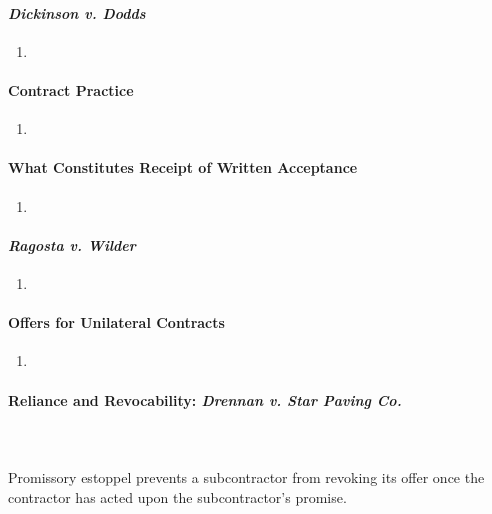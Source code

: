\paragraph{\emph{Dickinson v. Dodds}}

\begin{enumerate}
    \item %
\end{enumerate}

\paragraph{Contract Practice}

\begin{enumerate}
    \item %
\end{enumerate}

\paragraph{What Constitutes Receipt of Written Acceptance}

\begin{enumerate}
    \item %
\end{enumerate}

\paragraph{\emph{Ragosta v. Wilder}}

\begin{enumerate}
    \item %
\end{enumerate}

\paragraph{Offers for Unilateral Contracts}

\begin{enumerate}
    \item %
\end{enumerate}

\paragraph{Reliance and Revocability: \emph{Drennan v. Star Paving Co.}}
~\\\\
Promissory estoppel prevents a subcontractor from revoking its offer once the 
contractor has acted upon the subcontractor's promise.

